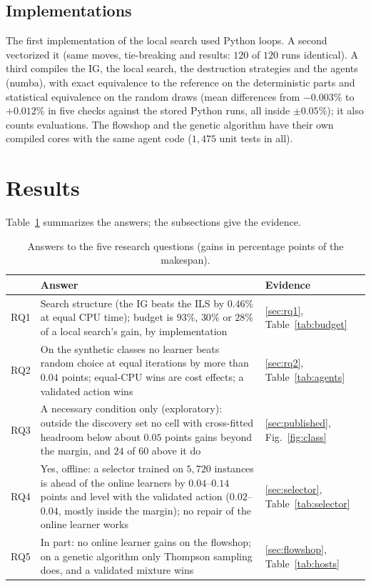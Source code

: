 \documentclass[conference,a4paper]{IEEEtran}
\begin{document}
\subsection{Implementations}
The first implementation of the local search used Python loops. A second vectorized it (same moves, tie-breaking and results: $120$ of $120$ runs identical). A third compiles the IG, the local
search, the destruction strategies and the agents (numba), with exact equivalence to the reference on the deterministic parts and statistical equivalence on the random draws
(mean differences from $-0.003\%$ to $+0.012\%$ in five checks against the stored Python runs, all inside $\pm0.05\%$); it also counts evaluations. The flowshop and the genetic algorithm have their own compiled cores with the same agent code ($1{,}475$ unit tests in all).

\section{Results}
Table~\ref{tab:answers} summarizes the answers; the subsections give the evidence.

\begin{table}[t]
\caption{Answers to the five research questions (gains in percentage points of the makespan).}
\label{tab:answers}
\centering
{\scriptsize\setlength{\tabcolsep}{3pt}
\begin{tabular}{@{}lp{13.2cm}l@{}}
\toprule
 & Answer & Evidence \\
\midrule
RQ1 & Search structure (the IG beats the ILS by $0.46\%$ at equal CPU time); budget is $93\%$, $30\%$ or $28\%$ of a local search's gain, by implementation & \ref{sec:rq1}, Table~\ref{tab:budget} \\
RQ2 & On the synthetic classes no learner beats random choice at equal iterations by more than $0.04$ points; equal-CPU wins are cost effects; a validated action wins & \ref{sec:rq2}, Table~\ref{tab:agents} \\
RQ3 & A necessary condition only (exploratory): outside the discovery set no cell with cross-fitted headroom below about $0.05$ points gains beyond the margin, and $24$ of $60$ above it do & \ref{sec:published}, Fig.~\ref{fig:class} \\
RQ4 & Yes, offline: a selector trained on $5{,}720$ instances is ahead of the online learners by $0.04$--$0.14$ points and level with the validated action ($0.02$--$0.04$, mostly inside the margin); no repair of the online learner works & \ref{sec:selector}, Table~\ref{tab:selector} \\
RQ5 & In part: no online learner gains on the flowshop; on a genetic algorithm only Thompson sampling does, and a validated mixture wins & \ref{sec:flowshop}, Table~\ref{tab:hosts} \\
\bottomrule
\end{tabular}}
\end{table}
\end{document}
